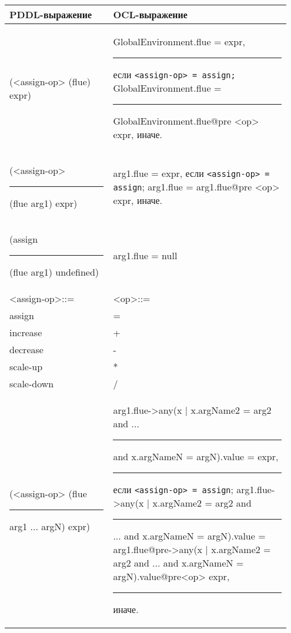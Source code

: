 {
    \renewcommand{\arraystretch}{1.3}
    \small
    \centering
    \ttfamily
    \begin{tabular}{|p{0.35\linewidth}|p{0.60\linewidth}|}
        \hline
        \normalfont\bfseries PDDL\:-выражение & \normalfont\bfseries OCL\:-выражение \\
        \hline
        (<assign-op> (flue) expr)
                &
                GlobalEnvironment.flue = expr\normalfont,\newline
                \rule{1em}{0em}если \texttt{<assign-op> = assign;}\newline\ttfamily
                GlobalEnvironment.flue = \newline
                \rule{1em}{0em}GlobalEnvironment.flue@pre <op> expr\normalfont, иначе.
                \\ 
        \hline
                (<assign-op> \newline \rule{1em}{0em} (flue arg1) expr)
                & 
                arg1.flue = expr\normalfont, если \texttt{<assign-op> = assign};\newline \ttfamily 
                arg1.flue = arg1.flue@pre <op> expr\normalfont, иначе.
                \\
        \hline
            (assign \newline
            \rule{1em}{0em}(flue arg1) undefined) & arg1.flue = null \\
        \hline
            <assign-op>::= & <op>::= \\
             \raggedleft  assign & = \\
             \raggedleft  increase & + \\
             \raggedleft  decrease & - \\
             \raggedleft  scale-up & * \\ 
             \raggedleft  scale-down & / \\
        \hline
            (<assign-op> (flue\newline 
            \rule{2em}{0em}  arg1 ... argN) expr) 
            &
            arg1.flue->any(x | x.argName2 = arg2 and ... \newline
            \rule{1em}{0em} and x.argNameN = argN).value = expr\normalfont,\newline
            \rule{1em}{0em} если \texttt{<assign-op> = assign};\newline\ttfamily
            arg1.flue->any(x | x.argName2 = arg2 and \newline
            \rule{1em}{0em} ... and x.argNameN = argN).value = \newline
            arg1.flue@pre->any(x | x.argName2 = arg2 and \newline
            ... and x.argNameN = argN).value@pre<op> expr\normalfont,\newline
            \rule{1em}{0em} иначе. \\
        \hline
    \end{tabular}
}
\\[5pt]

